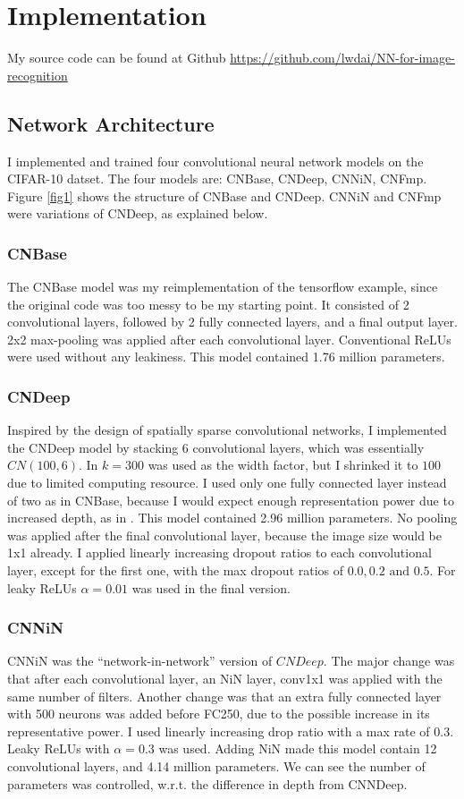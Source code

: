 \documentclass[conference]{IEEEtran}
\begin{document}
\section{Implementation}
My source code can be found at Github \url{https://github.com/lwdai/NN-for-image-recognition}
\subsection*{Network Architecture}
I implemented and trained four convolutional neural network models on the CIFAR-10 datset. The four models are: CNBase, CNDeep, CNNiN, CNFmp. Figure \ref{fig1} shows the structure of CNBase and CNDeep. CNNiN and CNFmp were variations of CNDeep, as explained below.

\subsubsection*{CNBase}
The CNBase model was my reimplementation of the tensorflow example\cite{tut}, since the original code was too messy to be my starting point. It consisted of 2 convolutional layers, followed by 2 fully connected layers, and a final output layer. 2x2 max-pooling was applied after each convolutional layer. Conventional ReLUs were used without any leakiness. This model contained 1.76 million parameters.

\subsubsection*{CNDeep}
Inspired by the design of spatially sparse convolutional networks\cite{sparse}, I implemented the CNDeep model by stacking 6 convolutional layers, which was essentially $CN(100,6)$. In \cite{sparse, fmp} $k=300$ was used as the width factor, but I shrinked it to $100$ due to limited computing resource. I used only one fully connected layer instead of two as in CNBase, because I would expect enough representation power due to increased depth, as in \cite{res, wide}. This model contained 2.96 million parameters. No pooling was applied after the final convolutional layer, because the image size would be 1x1 already. I applied linearly increasing dropout ratios to each convolutional layer, except for the first one, with the max dropout ratios of $0.0, 0.2 \text{ and } 0.5$. For leaky ReLUs $\alpha=0.01$ was used in the final version.

\subsubsection*{CNNiN}
CNNiN was the ``network-in-network''\cite{nin} version of $CNDeep$. The major change was that after each convolutional layer, an NiN layer, conv1x1 was applied with the same number of filters. Another change was that an extra fully connected layer with 500 neurons was added before FC250, due to the possible increase in its representative power. I used linearly increasing drop ratio with a max rate of $0.3$. Leaky ReLUs with $\alpha=0.3$ was used. Adding NiN made this model contain 12 convolutional layers, and 4.14 million parameters. We can see the number of parameters was controlled, w.r.t. the difference in depth from CNNDeep.
\end{document}
